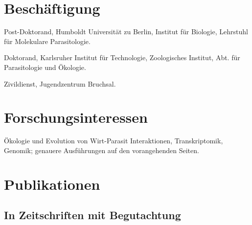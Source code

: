\documentclass[10pt,a4paper]{article}
\renewenvironment{itemize}{
  \begin{list}{}{
    \setlength{\leftmargin}{2.5em}
    \setlength{\itemsep}{0.25em}
    \setlength{\parskip}{0pt}
    \setlength{\parsep}{0.25em}
  }
}{
  \end{list}
}
\begin{document}
\section*{Besch\"aftigung}

\begin{itemize}
\item [M\"arz 2012 - now] Post-Doktorand, Humboldt Universit\"at zu
  Berlin, Institut f\"ur Biologie, Lehrstuhl f\"ur Molekulare
  Parasitologie.
\item [Jun 2008- Jul 2011] Doktorand, Karlsruher Institut f\"ur
  Technologie, Zoologisches Institut, Abt. f\"ur Parasitologie und
  \"Okologie.
\item [2000-2001] Zivildienst, Jugendzentrum Bruchsal.
\end{itemize}


\section*{Forschungsinteressen}
\"Okologie und Evolution von Wirt-Parasit Interaktionen, Transkriptomik,
Genomik; genauere Ausf\"uhrungen auf den vorangehenden Seiten.

\section*{Publikationen}

\subsection*{In Zeitschriften mit Begutachtung}
\end{document}
